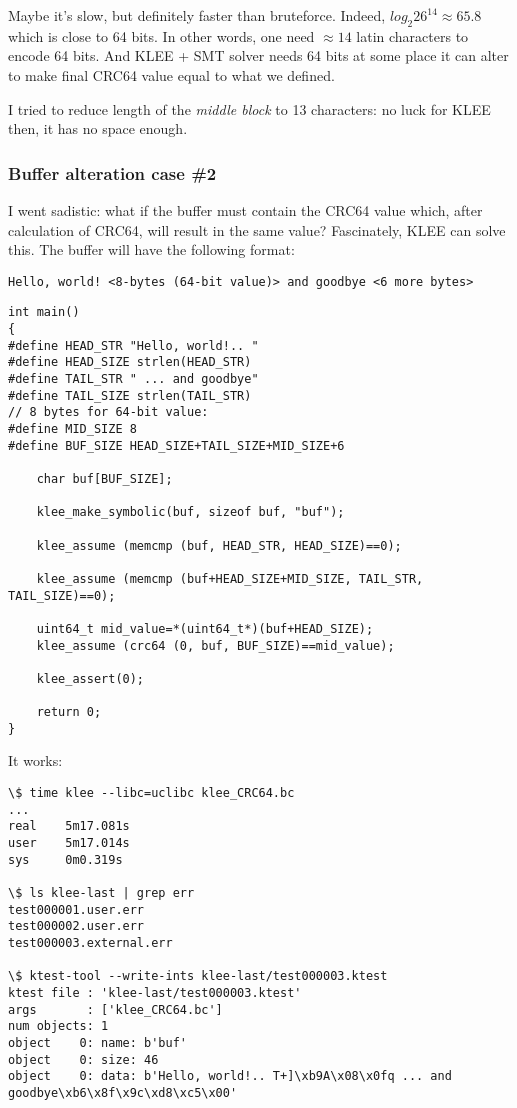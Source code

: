 Maybe it's slow, but definitely faster than bruteforce.
Indeed, $log_2{26^{14}} \approx 65.8$
which is close to 64 bits.
In other words, one need $\approx 14$ latin characters to encode 64 bits.
And KLEE + SMT solver needs 64 bits at some place it can alter to make final CRC64 value equal to what we defined.

I tried to reduce length of the \textit{middle block} to 13 characters: no luck for KLEE then, it has no space enough.

\subsubsection{Buffer alteration case \#2}

I went sadistic: what if the buffer must contain the CRC64 value which, after calculation of CRC64, will result in the same value?
Fascinately, %
KLEE can solve this.
The buffer will have the following format:

\begin{lstlisting}
Hello, world! <8-bytes (64-bit value)> and goodbye <6 more bytes>
\end{lstlisting}

\begin{lstlisting}
int main()
{
#define HEAD_STR "Hello, world!.. "
#define HEAD_SIZE strlen(HEAD_STR)
#define TAIL_STR " ... and goodbye"
#define TAIL_SIZE strlen(TAIL_STR)
// 8 bytes for 64-bit value:
#define MID_SIZE 8
#define BUF_SIZE HEAD_SIZE+TAIL_SIZE+MID_SIZE+6

	char buf[BUF_SIZE];
  
	klee_make_symbolic(buf, sizeof buf, "buf");

	klee_assume (memcmp (buf, HEAD_STR, HEAD_SIZE)==0);

	klee_assume (memcmp (buf+HEAD_SIZE+MID_SIZE, TAIL_STR, TAIL_SIZE)==0);
	
	uint64_t mid_value=*(uint64_t*)(buf+HEAD_SIZE);
	klee_assume (crc64 (0, buf, BUF_SIZE)==mid_value);

	klee_assert(0);

	return 0;
}
\end{lstlisting}

It works:

\begin{lstlisting}
\$ time klee --libc=uclibc klee_CRC64.bc
...
real    5m17.081s
user    5m17.014s
sys     0m0.319s

\$ ls klee-last | grep err
test000001.user.err
test000002.user.err
test000003.external.err

\$ ktest-tool --write-ints klee-last/test000003.ktest
ktest file : 'klee-last/test000003.ktest'
args       : ['klee_CRC64.bc']
num objects: 1
object    0: name: b'buf'
object    0: size: 46
object    0: data: b'Hello, world!.. T+]\xb9A\x08\x0fq ... and goodbye\xb6\x8f\x9c\xd8\xc5\x00'
\end{lstlisting}


